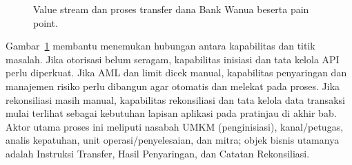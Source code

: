 \begin{figure}[htbp]
\centering
{}
\caption{Value stream dan proses transfer dana Bank Wanua beserta pain point.}
\label{fig:value-stream-bank-wanua}
\end{figure}

Gambar~\ref{fig:value-stream-bank-wanua} membantu menemukan hubungan antara
kapabilitas dan titik masalah. Jika otorisasi belum seragam, kapabilitas
inisiasi dan tata kelola API perlu diperkuat. Jika AML dan limit dicek manual,
kapabilitas penyaringan dan manajemen risiko perlu dibangun agar otomatis dan
melekat pada proses. Jika rekonsiliasi masih manual, kapabilitas rekonsiliasi
dan tata kelola data transaksi mulai terlihat sebagai kebutuhan lapisan
aplikasi pada pratinjau di akhir bab. Aktor utama proses ini meliputi nasabah
UMKM (penginisiasi), kanal/petugas, analis kepatuhan, unit operasi/penyelesaian,
dan mitra; objek bisnis utamanya adalah Instruksi Transfer, Hasil Penyaringan,
dan Catatan Rekonsiliasi.

